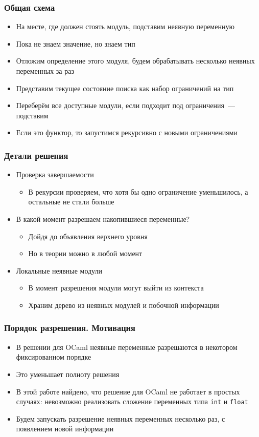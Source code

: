 \documentclass{beamer}
\begin{document}
\begin{frame}\frametitle{Общая схема}
\begin{itemize}
  \item На месте, где должен стоять модуль, подставим неявную переменную
  \item Пока не знаем значение, но знаем тип
  \item Отложим определение этого модуля, будем обрабатывать несколько неявных переменных за раз
  \item Представим текущее состояние поиска как набор ограничений на тип
  \item Переберём все доступные модули, если подходит под ограничения~--- подставим
  \item Если это функтор, то запустимся рекурсивно с новыми ограничениями
\end{itemize}
\end{frame}

\lstset{language=caml}
\begin{frame}[fragile]\frametitle{Детали решения}
\begin{itemize}
  \item Проверка завершаемости
  \begin{itemize}
    \item В рекурсии проверяем, что хотя бы одно ограничение уменьшилось, а остальные не стали больше
  \end{itemize}
  \item В какой момент разрешаем накопившиеся переменные?
  \begin{itemize}
    \item Дойдя до объявления верхнего уровня
    \item Но в теории можно в любой момент
  \end{itemize}
  \item Локальные неявные модули
  \begin{itemize}
    \item В момент разрешения модули могут выйти из контекста
    \item Храним дерево из неявных модулей и побочной информации
  \end{itemize}
\end{itemize}
\end{frame}

\begin{frame}\frametitle{Порядок разрешения. Мотивация}
\begin{itemize}
  \item В решении для OCaml неявные переменные разрешаются в некотором фиксированном порядке
  \item Это уменьшает полноту решения
  \item В этой работе найдено, что решение для OCaml не работает в простых случаях: невозможно реализовать сложение переменных типа \texttt{int} и \texttt{float}
  \item Будем запускать разрешение неявных переменных несколько раз, с появлением новой информации
\end{itemize}
\end{frame}
\end{document}
